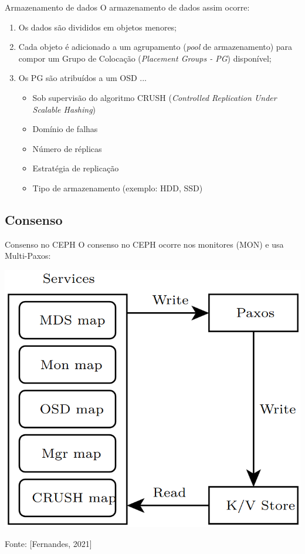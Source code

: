 \documentclass[xcolor=dvipsnames,table]{beamer}
\begin{document}
\begin{frame}{Armazenamento de dados}
	O armazenamento de dados assim ocorre:
	\begin{enumerate}
		\item Os dados são divididos em objetos menores;
		\item Cada objeto é adicionado a um agrupamento (\textit{pool} de armazenamento) para compor um Grupo de Colocação (\textit{Placement Groups - PG}) disponível;
		\item Os PG são atribuídos a um OSD ...
		\begin{itemize}
			\item Sob supervisão do algoritmo CRUSH (\textit{Controlled Replication Under Scalable Hashing})
			\item Domínio de falhas
			\item Número de réplicas
			\item Estratégia de replicação
			\item Tipo de armazenamento (exemplo: HDD, SSD)
		\end{itemize}
	\end{enumerate}
\end{frame}

\subsection{Consenso}
\begin{frame}{Consenso no CEPH}
	O consenso no CEPH ocorre nos monitores (MON) e usa Multi-Paxos:
	\begin{center}
		\includegraphics[scale=0.25]{ceph-paxos-1.png}
	\end{center}
	Fonte: [Fernandes, 2021]
\end{frame}
\end{document}
